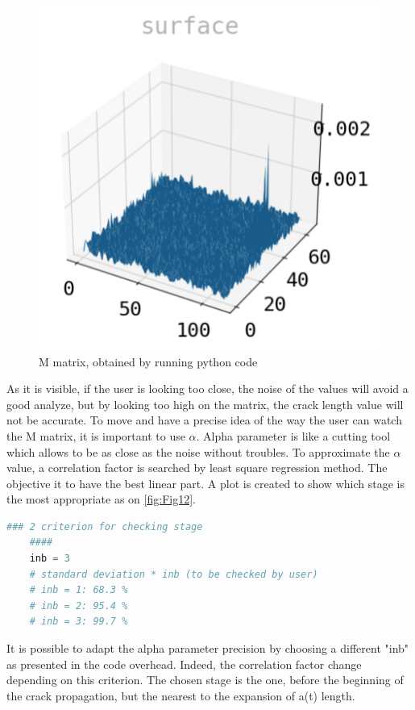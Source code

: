 \begin{figure}[h]
	\centering
	\includegraphics[scale=0.5]{Figures/M_matrix}
	\decoRule
	\caption[M matrix]{M matrix, obtained by running python code}
	\label{fig:Fig11}
\end{figure}

As it is visible, if the user is looking too close, the noise of the values will avoid a good analyze, but by looking too high on the matrix, the crack length value will not be accurate. To move and have a precise idea of the way the user can watch the M matrix, it is important to use $\alpha$. Alpha parameter is like a cutting tool which allows to be as close as the noise without troubles.
To approximate the $\alpha$ value, a correlation factor is searched by least square regression method. The objective it to have the best linear part. A plot is created to show which stage is the most appropriate as on \ref{fig:Fig12}.

\begin{lstlisting}[language=Python]
	### 2 criterion for checking stage
	####
	inb = 3
	# standard deviation * inb (to be checked by user)
	# inb = 1: 68.3 %
	# inb = 2: 95.4 %
	# inb = 3: 99.7 %
\end{lstlisting}

It is possible to adapt the alpha parameter precision by choosing a different "inb" as presented in the code overhead. Indeed, the correlation factor change depending on this criterion. The chosen stage is the one, before the beginning of the crack propagation, but the nearest to the expansion of a(t) length.

